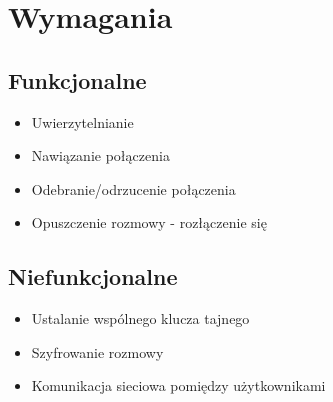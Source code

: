 \section{Wymagania}

\subsection{Funkcjonalne}

\begin{itemize}
    \item Uwierzytelnianie
    \item Nawiązanie połączenia
    \item Odebranie/odrzucenie połączenia
    \item Opuszczenie rozmowy - rozłączenie się
\end{itemize}


\subsection{Niefunkcjonalne}

\begin{itemize}
    \item Ustalanie wspólnego klucza tajnego
    \item Szyfrowanie rozmowy
    \item Komunikacja sieciowa pomiędzy użytkownikami
\end{itemize}